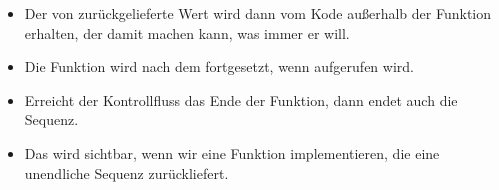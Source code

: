 \documentclass[aspectratio=169,mathserif,notheorems]{beamer}%
\begin{document}
\begin{frame}[t]
{{\begin{itemize}
{}%
%
%
%
%
%
%
%
\item<19-> Der von  zurückgelieferte Wert wird dann vom Kode außerhalb der Funktion erhalten, der damit machen kann, was immer er will.%
%
\item<20-> Die Funktion wird nach dem  fortgesetzt, wenn  aufgerufen wird.%
%
\item<21-> Erreicht der Kontrollfluss das Ende der Funktion, dann endet auch die Sequenz.%
%
\item<22-> Das wird sichtbar, wenn wir eine Funktion implementieren, die eine unendliche Sequenz zurückliefert.%
\end{itemize}%
}}%
%
%
%
\end{frame}%
%
%
\end{document}
